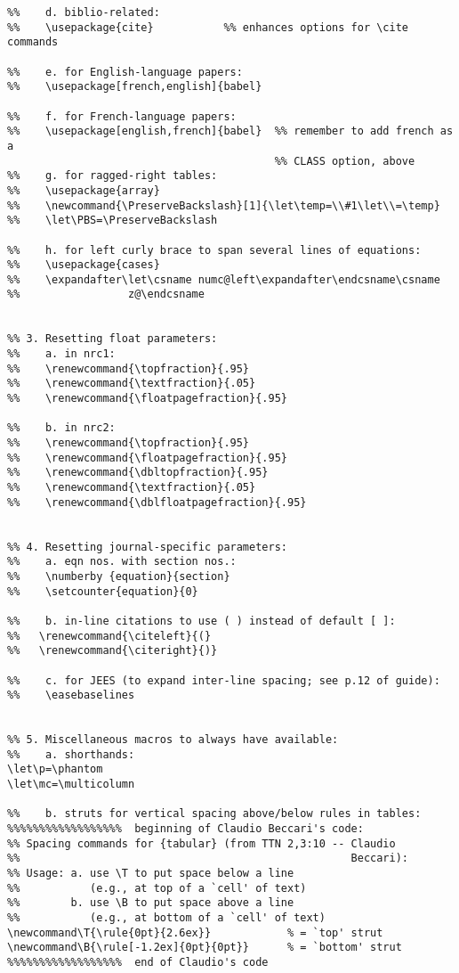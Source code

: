\begin{verbatim}
%%    d. biblio-related:
%%    \usepackage{cite}           %% enhances options for \cite commands

%%    e. for English-language papers:
%%    \usepackage[french,english]{babel}  

%%    f. for French-language papers: 
%%    \usepackage[english,french]{babel}  %% remember to add french as a
                                          %% CLASS option, above
%%    g. for ragged-right tables:
%%    \usepackage{array}
%%    \newcommand{\PreserveBackslash}[1]{\let\temp=\\#1\let\\=\temp}
%%    \let\PBS=\PreserveBackslash

%%    h. for left curly brace to span several lines of equations:
%%    \usepackage{cases}
%%    \expandafter\let\csname numc@left\expandafter\endcsname\csname 
%%                 z@\endcsname


%% 3. Resetting float parameters: 
%%    a. in nrc1:
%%    \renewcommand{\topfraction}{.95}
%%    \renewcommand{\textfraction}{.05}
%%    \renewcommand{\floatpagefraction}{.95}

%%    b. in nrc2:
%%    \renewcommand{\topfraction}{.95}
%%    \renewcommand{\floatpagefraction}{.95}
%%    \renewcommand{\dbltopfraction}{.95}
%%    \renewcommand{\textfraction}{.05}
%%    \renewcommand{\dblfloatpagefraction}{.95}


%% 4. Resetting journal-specific parameters:
%%    a. eqn nos. with section nos.:
%%    \numberby {equation}{section}
%%    \setcounter{equation}{0}

%%    b. in-line citations to use ( ) instead of default [ ]:
%%   \renewcommand{\citeleft}{(}
%%   \renewcommand{\citeright}{)}

%%    c. for JEES (to expand inter-line spacing; see p.12 of guide):
%%    \easebaselines


%% 5. Miscellaneous macros to always have available:
%%    a. shorthands:
\let\p=\phantom
\let\mc=\multicolumn

%%    b. struts for vertical spacing above/below rules in tables:
%%%%%%%%%%%%%%%%%%  beginning of Claudio Beccari's code:
%% Spacing commands for {tabular} (from TTN 2,3:10 -- Claudio
%%                                                    Beccari): 
%% Usage: a. use \T to put space below a line 
%%           (e.g., at top of a `cell' of text)
%%        b. use \B to put space above a line 
%%           (e.g., at bottom of a `cell' of text)
\newcommand\T{\rule{0pt}{2.6ex}}            % = `top' strut
\newcommand\B{\rule[-1.2ex]{0pt}{0pt}}      % = `bottom' strut
%%%%%%%%%%%%%%%%%%  end of Claudio's code 


\end{verbatim}
